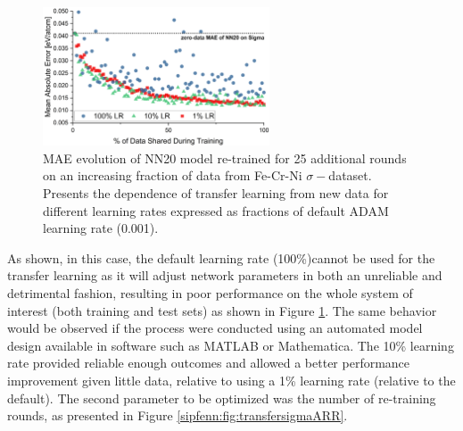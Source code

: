 \begin{figure}[H]
    \centering
    \includegraphics[width=0.6\textwidth]{sipfenn/transferLearning_MAE_vs_LearningRate.png}
    \caption{MAE evolution of NN20 model re-trained for 25 additional rounds on an increasing fraction of data from Fe-Cr-Ni $\sigma-$dataset. Presents the dependence of transfer learning from new data for different learning rates expressed as fractions of default ADAM learning rate (0.001).}
    \vspace{-12pt}
    \label{sipfenn:fig:transfersigmaLR}
\end{figure}

As shown, in this case, the default learning rate (100\%)cannot be used for the transfer learning as it will adjust network parameters in both an unreliable and detrimental fashion, resulting in poor performance on the whole system of interest (both training and test sets) as shown in Figure \ref{sipfenn:fig:transfersigmaLR}. The same behavior would be observed if the process were conducted using an automated model design available in software such as MATLAB or Mathematica. The 10\% learning rate provided reliable enough outcomes and allowed a better performance improvement given little data, relative to using a 1\% learning rate (relative to the default). The second parameter to be optimized was the number of re-training rounds, as presented in Figure \ref{sipfenn:fig:transfersigmaARR}.

